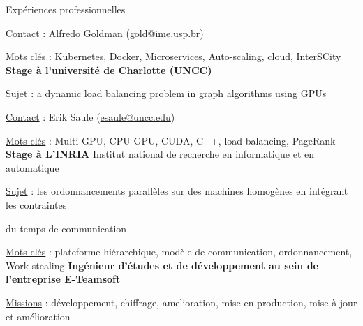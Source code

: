 \begin{rubric}{Expériences professionnelles}
    \hfill {}
    \par \underline{Contact} : Alfredo Goldman (\href{mailto:gold@ime.usp.br}{gold@ime.usp.br})
   \hfill {}
	\par \underline{Mots clés} : Kubernetes, Docker, Microservices, Auto-scaling, cloud, InterSCity
%
\entry*[]
 \textbf{Stage à l’université de Charlotte (UNCC)}
     \hfill{} 
	\par \underline{Sujet} : a dynamic load balancing problem in graph algorithms using GPUs
	\hfill {}
    \par \underline{Contact} : Erik Saule (\href{mailto:esaule@uncc.edu}{esaule@uncc.edu})
    \hfill {}
	\par \underline{Mots clés} : Multi-GPU, CPU-GPU, CUDA, C++, load balancing, PageRank
%
\entry*[]
    \textbf{Stage à L'INRIA} Institut national de recherche en informatique et en automatique
     \hfill{} 
	\par \underline{Sujet} : les ordonnancements parallèles sur des machines homogènes en intégrant les contraintes
	\hfill {}
    \par  du temps de communication
    \hfill {}
	\par \underline{Mots clés} : plateforme hiérarchique, modèle de communication, ordonnancement, Work stealing
%
%
\entry*[]
	\textbf{Ingénieur d'études et de développement au sein de l’entreprise E-Teamsoft}
     \hfill{} 
	\par \underline{Missions} : développement, chiffrage, amelioration, mise en production,
                              mise à jour et amélioration
    \hfill {}

\end{rubric}
